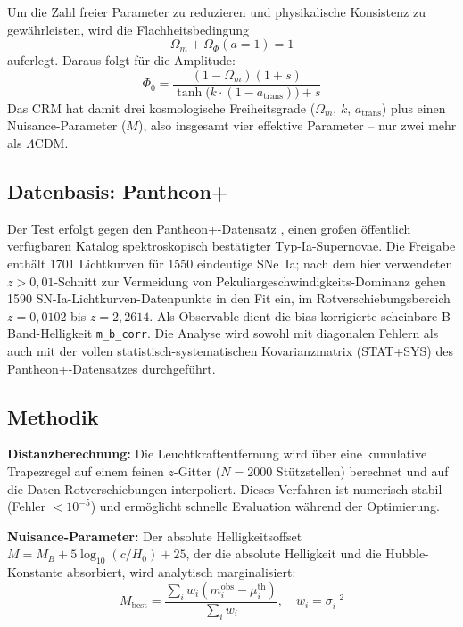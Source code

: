 \documentclass[aps,prd,twocolumn,superscriptaddress,nofootinbib]{revtex4-2}
\begin{document}
Um die Zahl freier Parameter zu reduzieren und physikalische Konsistenz zu gew\"ahrleisten, wird die Flachheitsbedingung
\begin{equation}
\Omega_m + \Omega_\Phi(a{=}1) = 1
\label{eq:flatness}
\end{equation}
auferlegt. Daraus folgt f\"ur die Amplitude:
\begin{equation}
\Phi_0 = \frac{(1 - \Omega_m)(1 + s)}{\tanh\!\big(k\cdot(1 - a_{\mathrm{trans}})\big) + s}
\end{equation}
Das CRM hat damit drei kosmologische Freiheitsgrade ($\Omega_m$, $k$, $a_{\mathrm{trans}}$) plus einen Nuisance-Parameter ($M$), also insgesamt vier effektive Parameter -- nur zwei mehr als $\Lambda$CDM.

\subsection{Datenbasis: Pantheon+}
\label{subsec:pantheonplus}

Der Test erfolgt gegen den Pantheon+-Datensatz \cite{Scolnic2022}, einen großen öffentlich verfügbaren Katalog spektroskopisch bestätigter Typ-Ia-Supernovae. Die Freigabe enthält 1701 Lichtkurven für 1550 eindeutige SNe~Ia; nach dem hier verwendeten $z > 0{,}01$-Schnitt zur Vermeidung von Pekuliargeschwindigkeits-Dominanz gehen 1590 SN-Ia-Lichtkurven-Datenpunkte in den Fit ein, im Rotverschiebungsbereich $z = 0{,}0102$ bis $z = 2{,}2614$. Als Observable dient die bias-korrigierte scheinbare B-Band-Helligkeit \texttt{m\_b\_corr}. Die Analyse wird sowohl mit diagonalen Fehlern als auch mit der vollen statistisch-systematischen Kovarianzmatrix (STAT+SYS) des Pantheon+-Datensatzes durchgeführt.

\subsection{Methodik}
\label{subsec:methodik}

\textbf{Distanzberechnung:} Die Leuchtkraftentfernung wird \"uber eine kumulative Trapezregel auf einem feinen $z$-Gitter ($N = 2000$ St\"utzstellen) berechnet und auf die Daten-Rotverschiebungen interpoliert. Dieses Verfahren ist numerisch stabil (Fehler $< 10^{-5}$) und erm\"oglicht schnelle Evaluation w\"ahrend der Optimierung.

\textbf{Nuisance-Parameter:} Der absolute Helligkeitsoffset $M = M_B + 5\log_{10}(c/H_0) + 25$, der die absolute Helligkeit und die Hubble-Konstante absorbiert, wird analytisch marginalisiert:
\begin{equation}
M_{\mathrm{best}} = \frac{\sum_i w_i (m_i^{\mathrm{obs}} - \mu_i^{\mathrm{th}})}{\sum_i w_i}, \quad w_i = \sigma_i^{-2}
\end{equation}
\end{document}
